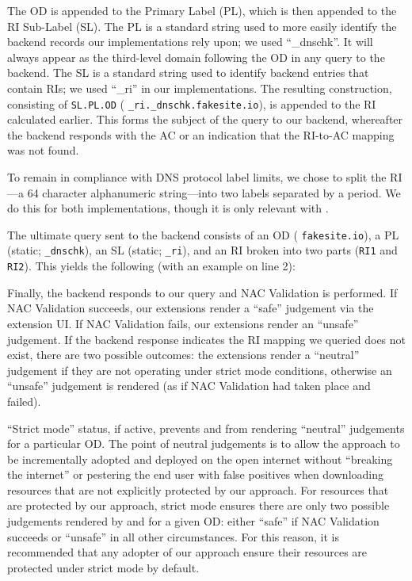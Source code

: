 The OD is appended to the Primary Label (PL), which is then appended to the
RI Sub-Label (SL). The PL is a standard string used to more easily identify the
backend records our implementations rely upon; we used ``\_dnschk''. It will
always appear as the third-level domain following the OD in any query to the
backend. The SL is a standard string used to identify backend entries that
contain RIs; we used ``\_ri'' in our implementations. The resulting
construction, consisting of \texttt{SL.PL.OD} (\eg
\texttt{\_ri.\_dnschk.fakesite.io}), is appended to the RI calculated earlier.
This forms the subject of the query to our backend, whereafter the backend
responds with the AC or an indication that the RI-to-AC mapping was not found.

To remain in compliance with DNS protocol label limits, we chose to split the
RI---a 64 character alphanumeric string---into two labels separated by a period.
We do this for both implementations, though it is only relevant with \DNSSYS{}.

The ultimate query sent to the backend consists of an OD (\eg
\texttt{fakesite.io}), a PL (static; \ie \texttt{\_dnschk}), an SL (static; \ie
\texttt{\_ri}), and an RI broken into two parts (\ie \texttt{RI1} and
\texttt{RI2}). This yields the following (with an example on line 2): \\

Finally, the backend responds to our query and NAC Validation is performed. If
NAC Validation succeeds, our extensions render a ``safe'' judgement via the
extension UI. If NAC Validation fails, our extensions render an ``unsafe''
judgement. If the backend response indicates the RI mapping we queried does not
exist, there are two possible outcomes: the extensions render a ``neutral''
judgement if they are not operating under strict mode conditions, otherwise an
``unsafe'' judgement is rendered (as if NAC Validation had taken place and
failed).

``Strict mode'' status, if active, prevents \DNSSYS{} and \DHTSYS{} from
rendering ``neutral'' judgements for a particular OD. The point of neutral
judgements is to allow the \SYSTEM{} approach to be incrementally adopted and
deployed on the open internet without ``breaking the internet'' or pestering the
end user with false positives when downloading resources that are not explicitly
protected by our approach. For resources that are protected by our approach,
strict mode ensures there are only two possible judgements rendered by \DNSSYS{}
and \DHTSYS{} for a given OD: either ``safe'' if NAC Validation succeeds or
``unsafe'' in all other circumstances. For this reason, it is recommended that
any adopter of our approach ensure their resources are protected under strict
mode by default.

